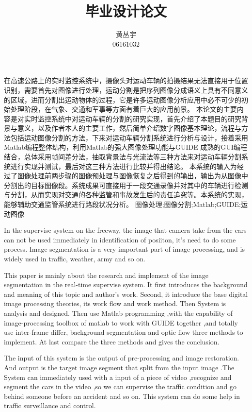 \documentclass[18pt, twoside, a4paper, dvipdfm]{book}
\begin{document}
\title{毕业设计论文}
\author{黄丛宇\\06161032}
\maketitle

\lfour

\zhabstract 
在高速公路上的实时监控系统中，摄像头对运动车辆的拍摄结果无法直接用于位置识别，需要首先对图像进行处理，运动分割是把序列图像分成语义上具有不同意义的区域，进而分割出运动物体的过程，它是许多运动图像分析应用中必不可少的初始处理阶段，在气象、交通和军事等方面有着巨大的应用前景。
本论文的主要内容是对实时监控系统中对运动车辆的分割的研究实现，首先介绍了本题目的研究背景与意义，以及作者本人的主要工作，然后简单介绍数字图像基本理论，流程与方法包括运动图像分割的方法，下来对运动车辆分割系统进行分析与设计，接着采用Matlab编程整体结构，利用Matlab的强大图像处理功能与GUIDE 成熟的GUI编程结合，总体采用帧间差分法，抽取背景法与光流法等三种方法来对运动车辆分割系统进行实现并测试，最后对这三种方法进行比较并得出结论。
本系统的输入为经过了图像处理前两步骤的图像预处理与图像恢复之后得到的输出，输出为从图像中分割出的目标图像段。系统成果可直接用于一段交通录像并对其中的车辆进行检测与分割，从而实现对交通的各种监管和事故发生后的责任追究等。本系统的实现，能够辅助交通监管系统进行路段状况分析。
{\zhkeywords 图像处理;图像分割;Matlab;GUIDE;运动图像}

\enabstract
In the supervise system on the freeway, the image that camera take from the cars can not be used immediately in identification of posiiton, it’s need to do some process. Image segmentation is a very important part of image processing, and is widely used in traffic, weather, army and so on. 

This paper is mainly about the research and implement of the image segmentation in the real-time supervise system. It first introduces the background and meaning of this topic and author’s work. Second, it introduce the base digital image processing theories, its work flow and work method. Then System is analysis and designed. Then use Matlab  programming ,with the capability of image-processing toolbox of matlab to work with GUIDE together ,and totally use inter-frame differ, background segmentation and optic flow three methods to implement. At last compare the three methods and gives the conclusion.

The input of this system is the output of pre-processing and image restoration. And output is the target image segment that split from the input image .The System can immediately used with a input of a piece of video ,recognize and segment the cars in the video ,so we can supervise the traffic condition and go behind someone before an accident and so on. This system can do some help in traffic surveillance and control.
\end{document}

